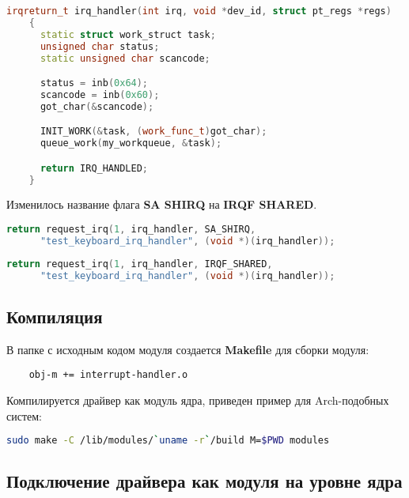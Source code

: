 \documentclass[a4paper,11pt]{article}
\begin{document}
    \lstset{style=diffgreen}
    \begin{lstlisting}[language = C++]
    irqreturn_t irq_handler(int irq, void *dev_id, struct pt_regs *regs)
    {
      static struct work_struct task;
      unsigned char status;
      static unsigned char scancode;

      status = inb(0x64);
      scancode = inb(0x60);
      got_char(&scancode);

      INIT_WORK(&task, (work_func_t)got_char);
      queue_work(my_workqueue, &task);

      return IRQ_HANDLED;
    }
    \end{lstlisting}

    Изменилось название флага \textbf{SA SHIRQ} на \textbf{IRQF SHARED}.

    \lstset{style=diffred}
    \begin{lstlisting}[language = C++]
    return request_irq(1, irq_handler, SA_SHIRQ,
      "test_keyboard_irq_handler", (void *)(irq_handler));
    \end{lstlisting}

    \lstset{style=diffgreen}
    \begin{lstlisting}[language = C++]
    return request_irq(1, irq_handler, IRQF_SHARED,
      "test_keyboard_irq_handler", (void *)(irq_handler));
    \end{lstlisting}

  \lstset{style=mycode}
  \subsection{Компиляция}
    В папке с исходным кодом модуля создается \textbf{Makefile} для
    сборки модуля:

    \begin{lstlisting}
    obj-m += interrupt-handler.o
    \end{lstlisting}

    Компилируется драйвер как модуль ядра, приведен пример для Arch-подобных систем:

    \begin{lstlisting}[language = bash]
    sudo make -C /lib/modules/`uname -r`/build M=$PWD modules
    \end{lstlisting}

  \subsection{Подключение драйвера как модуля на уровне ядра}
\end{document}
